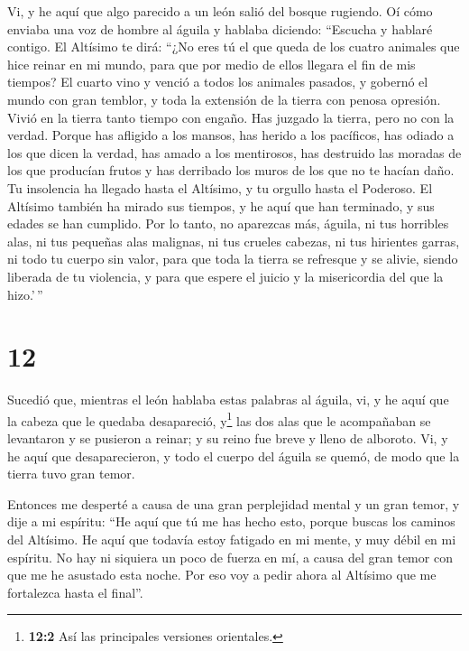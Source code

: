  Vi, y he aquí que algo parecido a un león salió del
bosque rugiendo. Oí cómo enviaba una voz de hombre al águila y hablaba
diciendo:  ``Escucha y hablaré contigo. El Altísimo te
dirá:  ``¿No eres tú el que queda de los cuatro animales
que hice reinar en mi mundo, para que por medio de ellos llegara el fin
de mis tiempos?  El cuarto vino y venció a todos los
animales pasados, y gobernó el mundo con gran temblor, y toda la
extensión de la tierra con penosa opresión. Vivió en la tierra tanto
tiempo con engaño.  Has juzgado la tierra, pero no con la
verdad.  Porque has afligido a los mansos, has herido a
los pacíficos, has odiado a los que dicen la verdad, has amado a los
mentirosos, has destruido las moradas de los que producían frutos y has
derribado los muros de los que no te hacían daño.  Tu
insolencia ha llegado hasta el Altísimo, y tu orgullo hasta el Poderoso.
 El Altísimo también ha mirado sus tiempos, y he aquí que
han terminado, y sus edades se han cumplido.  Por lo
tanto, no aparezcas más, águila, ni tus horribles alas, ni tus pequeñas
alas malignas, ni tus crueles cabezas, ni tus hirientes garras, ni todo
tu cuerpo sin valor,  para que toda la tierra se
refresque y se alivie, siendo liberada de tu violencia, y para que
espere el juicio y la misericordia del que la hizo.'\,''

\hypertarget{section-11}{%
\section{12}\label{section-11}}

 Sucedió que, mientras el león hablaba estas palabras al
águila, vi,  y he aquí que la cabeza que le quedaba
desapareció, y\footnote{\textbf{12:2} Así las principales versiones
  orientales.} las dos alas que le acompañaban se levantaron y se
pusieron a reinar; y su reino fue breve y lleno de alboroto.
 Vi, y he aquí que desaparecieron, y todo el cuerpo del
águila se quemó, de modo que la tierra tuvo gran temor.

Entonces me desperté a causa de una gran perplejidad mental y un gran
temor, y dije a mi espíritu:  ``He aquí que tú me has
hecho esto, porque buscas los caminos del Altísimo.  He
aquí que todavía estoy fatigado en mi mente, y muy débil en mi espíritu.
No hay ni siquiera un poco de fuerza en mí, a causa del gran temor con
que me he asustado esta noche.  Por eso voy a pedir ahora
al Altísimo que me fortalezca hasta el final''.

